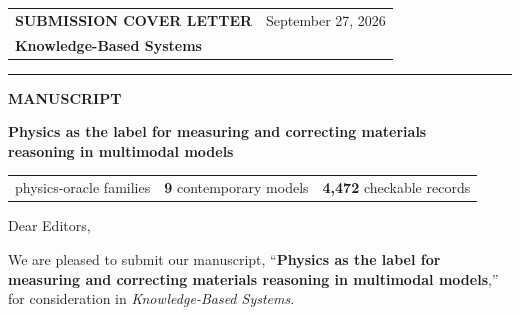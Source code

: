 \documentclass[10pt,a4paper]{article}
\newcommand{\smallcapslabel}[1]{%
  {\fontsize{8.4}{10}\selectfont\bfseries\color{Teal}\MakeUppercase{#1}}%
}
\begin{document}

\begin{tabularx}{\textwidth}{@{}X>{\raggedleft\arraybackslash}p{4.4cm}@{}}

\smallcapslabel{Submission cover letter}
&
{\small\color{Muted} September 27, 2026}
\\[0.18em]

{\Large\bfseries\color{Navy}
Knowledge-Based Systems}
&
\\

\end{tabularx}

\vspace{0.55em}
{\color{Rule}\rule{\textwidth}{0.7pt}}
\vspace{0.75em}

{\smallcapslabel{Manuscript}}\\[0.18em]

{\fontsize{14.2}{17}\selectfont\bfseries\color{Navy}
Physics as the label for measuring and correcting materials\\
reasoning in multimodal models\par}

\vspace{0.55em}

\begin{tcolorbox}[
  colback=PaleBlue,
  colframe=PaleBlue,
  boxrule=0pt,
  arc=1.2mm,
  left=3mm,
  right=3mm,
  top=1.9mm,
  bottom=1.9mm
]

\begin{tabularx}{\textwidth}
{@{}>{\centering\arraybackslash}X
>{\centering\arraybackslash}X
>{\centering\arraybackslash}X@{}}

{\bfseries\color{Navy} 6}
{\small physics-oracle families}
&
{\bfseries\color{Navy} 9}
{\small contemporary models}
&
{\bfseries\color{Navy} 4,472}
{\small checkable records}

\end{tabularx}

\end{tcolorbox}

\vspace{0.35em}

Dear Editors,

We are pleased to submit our manuscript,
``\textbf{Physics as the label for measuring and correcting materials reasoning in multimodal models},''
for consideration in \textit{Knowledge-Based Systems}.
\end{document}
